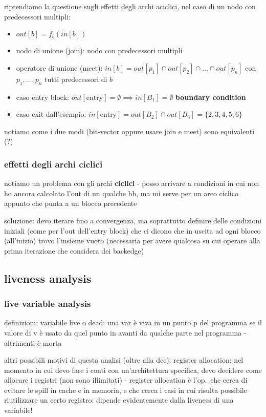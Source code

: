 riprendiamo la questione sugli effetti degli archi aciclici, nel caso di un nodo con predecessori multipli:
\begin{itemize}
  \item $out[b] = f_b(in[b])$
  \item nodo di unione (join): nodo con predecessori multipli
  \item operatore di unione (meet): $in[b] = out[p_1] \cap out[p_2] \cap \ldots \cap out[p_n]$ con $p_1,\ldots,p_n$ tutti predecessori di $b$
  \item caso entry block: $out[\text{entry}] = \emptyset \implies in[B_1] = \emptyset$ \textbf{boundary condition}
  \item caso exit dall'esempio: $in[\text{entry}] = out[B_2] \cap out[B_3] = \lbrace 2,3,4,5,6 \rbrace$
\end{itemize}

notiamo come i due modi (bit-vector oppure usare join e meet) sono equivalenti (?)

\subsubsection{effetti degli archi ciclici}

notiamo un problema con gli archi \textbf{ciclici} - posso arrivare a condizioni in cui non ho ancora calcolato l'out di un qualche bb, ma mi serve per un arco ciclico appunto che punta a un blocco precedente

soluzione: devo iterare fino a convergenza, ma soprattutto definire delle condizioni iniziali (come per l'out dell'entry block) che ci dicono che in uscita ad ogni blocco (all'inizio) trovo l'insieme vuoto (necessaria per avere qualcosa su cui operare alla prima iterazione che considera dei backedge)

\subsection{liveness analysis}

\subsubsection{live variable analysis}

definizioni: variabile live o dead: una var \`e viva in un punto p del programma se il valore di v \`e usato da quel punto in avanti da qualche parte nel programma - altrimenti \`e morta

altri possibili motivi di questa analisi (oltre alla dce): register allocation: nel momento in cui devo fare i conti con un'architettura specifica, devo decidere come allocare i registri (non sono illimitati) - register allocation \`e l'op.~che cerca di evitare le spill in cache e in memoria, e che cerca i casi in cui risulta possibile riutilizzare un certo registro: dipende evidentemente dalla liveness di una variabile!

